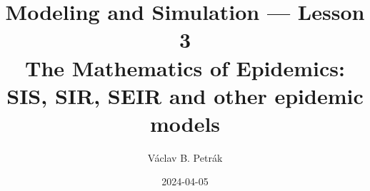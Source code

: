 \documentclass[11pt]{beamer}
\title{
Modeling and Simulation --- Lesson 3\\
\textbf{The Mathematics of Epidemics:\\
SIS, SIR,  SEIR and other epidemic models}}
\author{Václav B. Petrák}
\institute{Faculty of Biomedical Engineering\\
Czech Technical University}
\date{2024-04-05}
\begin{document}
\begin{frame}
  \titlepage
\end{frame}

%


\end{document}

